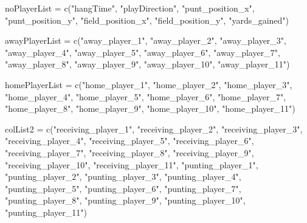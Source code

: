 \documentclass[
]{article}
\newenvironment{Shaded}{\begin{snugshade}}{\end{snugshade}}
\newcommand{\FunctionTok}[1]{\textcolor[rgb]{0.00,0.00,0.00}{#1}}
\newcommand{\NormalTok}[1]{#1}
\newcommand{\OtherTok}[1]{\textcolor[rgb]{0.56,0.35,0.01}{#1}}
\newcommand{\StringTok}[1]{\textcolor[rgb]{0.31,0.60,0.02}{#1}}
\begin{document}
\begin{Shaded}
\begin{Highlighting}[]
\NormalTok{noPlayerList }\OtherTok{=} \FunctionTok{c}\NormalTok{(}\StringTok{"hangTime"}\NormalTok{, }\StringTok{"playDirection"}\NormalTok{, }\StringTok{"punt\_position\_x"}\NormalTok{, }\StringTok{"punt\_position\_y"}\NormalTok{, }\StringTok{"field\_position\_x"}\NormalTok{, }\StringTok{"field\_position\_y"}\NormalTok{, }\StringTok{"yards\_gained"}\NormalTok{)}

\NormalTok{awayPlayerList }\OtherTok{=} \FunctionTok{c}\NormalTok{(}\StringTok{"away\_player\_1"}\NormalTok{, }\StringTok{"away\_player\_2"}\NormalTok{, }\StringTok{"away\_player\_3"}\NormalTok{, }\StringTok{"away\_player\_4"}\NormalTok{, }\StringTok{"away\_player\_5"}\NormalTok{, }\StringTok{"away\_player\_6"}\NormalTok{, }\StringTok{"away\_player\_7"}\NormalTok{, }\StringTok{"away\_player\_8"}\NormalTok{, }\StringTok{"away\_player\_9"}\NormalTok{, }\StringTok{"away\_player\_10"}\NormalTok{, }\StringTok{"away\_player\_11"}\NormalTok{)}

\NormalTok{homePlayerList }\OtherTok{=} \FunctionTok{c}\NormalTok{(}\StringTok{"home\_player\_1"}\NormalTok{, }\StringTok{"home\_player\_2"}\NormalTok{, }\StringTok{"home\_player\_3"}\NormalTok{, }\StringTok{"home\_player\_4"}\NormalTok{, }\StringTok{"home\_player\_5"}\NormalTok{, }\StringTok{"home\_player\_6"}\NormalTok{, }\StringTok{"home\_player\_7"}\NormalTok{, }\StringTok{"home\_player\_8"}\NormalTok{, }\StringTok{"home\_player\_9"}\NormalTok{, }\StringTok{"home\_player\_10"}\NormalTok{, }\StringTok{"home\_player\_11"}\NormalTok{)}

\NormalTok{colList2 }\OtherTok{=} \FunctionTok{c}\NormalTok{(}\StringTok{"receiving\_player\_1"}\NormalTok{, }\StringTok{"receiving\_player\_2"}\NormalTok{, }\StringTok{"receiving\_player\_3"}\NormalTok{, }\StringTok{"receiving\_player\_4"}\NormalTok{, }\StringTok{"receiving\_player\_5"}\NormalTok{, }\StringTok{"receiving\_player\_6"}\NormalTok{, }\StringTok{"receiving\_player\_7"}\NormalTok{, }\StringTok{"receiving\_player\_8"}\NormalTok{, }\StringTok{"receiving\_player\_9"}\NormalTok{, }\StringTok{"receiving\_player\_10"}\NormalTok{, }\StringTok{"receiving\_player\_11"}\NormalTok{, }\StringTok{"punting\_player\_1"}\NormalTok{, }\StringTok{"punting\_player\_2"}\NormalTok{, }\StringTok{"punting\_player\_3"}\NormalTok{, }\StringTok{"punting\_player\_4"}\NormalTok{, }\StringTok{"punting\_player\_5"}\NormalTok{, }\StringTok{"punting\_player\_6"}\NormalTok{, }\StringTok{"punting\_player\_7"}\NormalTok{, }\StringTok{"punting\_player\_8"}\NormalTok{, }\StringTok{"punting\_player\_9"}\NormalTok{, }\StringTok{"punting\_player\_10"}\NormalTok{, }\StringTok{"punting\_player\_11"}\NormalTok{)}


\end{Highlighting}
\end{Shaded}
\end{document}
